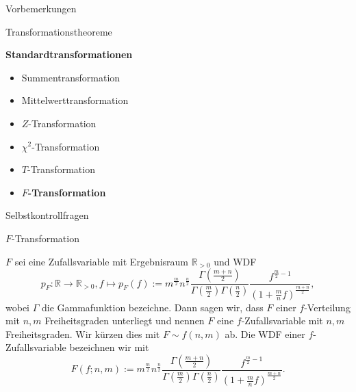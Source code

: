 \documentclass[
  8pt,
  ignorenonframetext,
]{beamer}
\providecommand{\tightlist}{%
  \setlength{\itemsep}{0pt}\setlength{\parskip}{0pt}}
\begin{document}
\begin{frame}{}
\protect\hypertarget{section-11}{}
\large

Vorbemerkungen

Transformationstheoreme

\textbf{Standardtransformationen}

\normalsize

\begin{itemize}
\tightlist
\item
  Summentransformation
\item
  Mittelwerttransformation
\item
  \(Z\)-Transformation
\item
  \(\chi^2\)-Transformation
\item
  \(T\)-Transformation
\item
  \textbf{\(F\)-Transformation}
\end{itemize}

\large

Selbstkontrollfragen
\end{frame}

\begin{frame}{\(F\)-Transformation}
\protect\hypertarget{f-transformation}{}
\small
\begin{definition}[$f$-Zufallsvariable]
\justifying
$F$ sei eine Zufallsvariable mit Ergebnisraum $\mathbb{R}_{>0}$ und WDF
\begin{equation}
p_F : \mathbb{R} \to \mathbb{R}_{>0}, f \mapsto p_F(f)
:= m^{\frac{m}{2}}n^{\frac{n}{2}}
   \frac{\Gamma\left(\frac{m+n}{2}\right)}{\Gamma\left(\frac{m}{2}\right)\Gamma\left(\frac{n}{2}\right)}
   \frac{f^{\frac{m}{2}-1}}{\left(1 + \frac{m}{n}f \right)^{\frac{m+n}{2}}},
\end{equation}
wobei $\Gamma$ die Gammafunktion bezeichne. Dann sagen wir, dass $F$ einer
$f$-Verteilung mit $n,m$ Freiheitsgraden unterliegt und nennen $F$ eine
$f$-Zufallsvariable mit $n,m$ Freiheitsgraden. Wir kürzen dies mit $F \sim f(n,m)$ ab.
Die WDF einer $f$-Zufallsvariable bezeichnen wir mit
\begin{equation}
F(f;n,m)
:= m^{\frac{m}{2}}n^{\frac{n}{2}}
   \frac{\Gamma\left(\frac{m+n}{2}\right)}{\Gamma\left(\frac{m}{2}\right)\Gamma\left(\frac{n}{2}\right)}
   \frac{f^{\frac{m}{2}-1}}{\left(1 + \frac{m}{n}f \right)^{\frac{m+n}{2}}}.
\end{equation}
\end{definition}
\end{frame}
\end{document}
